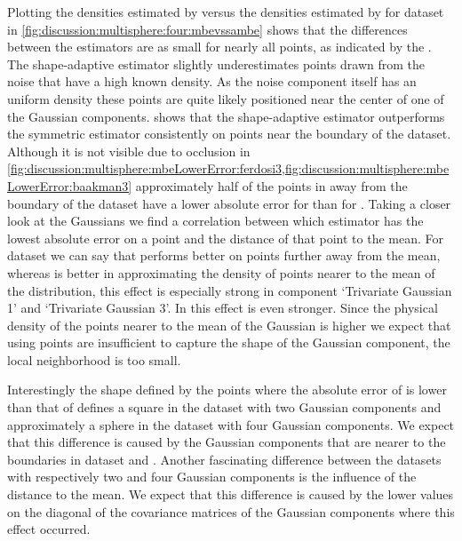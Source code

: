 	Plotting the densities estimated by \sambe versus the densities estimated by \mbe for dataset \baakmanFive in \cref{fig:discussion:multisphere:four:mbevssambe} shows that the differences between the estimators are as small for nearly all points, as indicated by the \mse. The shape-adaptive estimator slightly underestimates points drawn from the noise that have a high known density. As the noise component itself has an uniform density these points are quite likely positioned near the center of one of the Gaussian components. 
	 shows that the shape-adaptive estimator outperforms the symmetric estimator consistently on points near the boundary of the dataset. Although it is not visible due to occlusion in \cref{fig:discussion:multisphere:mbeLowerError:ferdosi3,fig:discussion:multisphere:mbeLowerError:baakman3} approximately half of the points in away from the boundary of the dataset have a lower absolute error for \sambe than for \mbe. Taking a closer look at the Gaussians we find a correlation between which estimator has the lowest absolute error on a point and the distance of that point to the mean. For dataset \ferdosiThree we can say that \sambe performs better on points further away from the mean, whereas \mbe is better in approximating the density of points nearer to the mean of the distribution, this effect is especially strong in component `Trivariate Gaussian 1' and `Trivariate Gaussian 3'. In \baakmanThree this effect is even stronger. Since the physical density of the points nearer to the mean of the Gaussian is higher we expect that using \KNNK points are insufficient to capture the shape of the Gaussian component, \ie the local neighborhood is too small. 

	Interestingly the shape defined by the points where the absolute error of \mbe is lower than that of \sambe defines a square in the dataset with two Gaussian components and approximately a sphere in the dataset with four Gaussian components. We expect that this difference is caused by the Gaussian components that are nearer to the boundaries in dataset \ferdosiThree and \baakmanThree. 
	Another fascinating difference between the datasets with respectively two and four Gaussian components is the influence of the distance to the mean. We expect that this difference is caused by the lower values on the diagonal of the covariance matrices of the Gaussian components where this effect occurred. 

